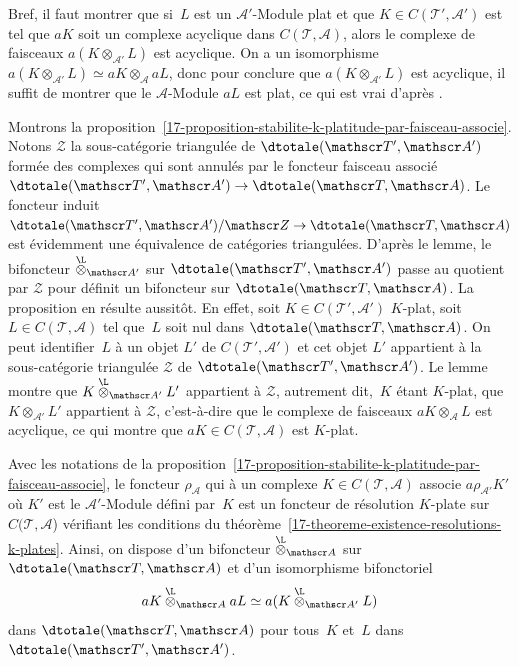 \documentclass[10pt]{../fichiers-configuration-latex/smfart}
\begin{document}
Bref, il faut montrer que si $L$ est un $\mathscr A'$-Module plat et que
$K\in C(\mathscr T',\mathscr A')$ est tel que $aK$ soit un complexe
acyclique dans $C(\mathscr T,\mathscr A)$, alors le complexe de faisceaux 
$a(K\otimes_{\mathscr A'} L)$ est acyclique. On a un isomorphisme
$a(K\otimes_{\mathscr A'} L)\simeq aK\otimes_{\mathscr A}aL$, donc pour
conclure que $a(K\otimes_{\mathscr A'} L)$ est acyclique, il suffit de
montrer que le $\mathscr A$-Module $aL$ est plat, ce qui est vrai d'après
.

\bigskip

Montrons la
proposition~\ref{17-proposition-stabilite-k-platitude-par-faisceau-associe}.
Notons $\mathscr Z$ la sous-catégorie triangulée de $\dtotale(\mathscr T',\mathscr
A')$ formée des complexes qui sont annulés par le foncteur faisceau associé
$\dtotale(\mathscr T',\mathscr A')\to \dtotale(\mathscr T,\mathscr A)$. Le foncteur
induit $\dtotale(\mathscr T',\mathscr A')/\mathscr Z\to \dtotale(\mathscr T,\mathscr A)$
est évidemment une équivalence de catégories triangulées. D'après le lemme,
le bifoncteur $\overset{\L}\otimes_{\mathscr A'}$ sur $\dtotale(\mathscr
T',\mathscr A')$ passe au quotient par $\mathscr Z$ pour définit un
bifoncteur sur $\dtotale(\mathscr T,\mathscr A)$. La proposition en résulte
aussitôt. En effet, soit $K\in C(\mathscr T',\mathscr A')$ $K$-plat, soit
$L\in C(\mathscr T,\mathscr A)$ tel que $L$ soit nul dans $\dtotale(\mathscr
T,\mathscr A)$. On peut identifier $L$ à un objet $L'$ de $C(\mathscr
T',\mathscr A')$ et cet objet $L'$ appartient à la sous-catégorie
triangulée $\mathscr Z$ de $\dtotale(\mathscr T',\mathscr A')$. Le lemme montre
que $K\overset{\L}\otimes_{\mathscr A'} L'$ appartient à $\mathscr
Z$, autrement dit, $K$ étant $K$-plat, que $K\otimes_{\mathscr A'} L'$
appartient à $\mathscr Z$, c'est-à-dire que le complexe 
de faisceaux $aK\otimes_{\mathscr A} L$ est acyclique, ce qui montre que
$aK\in C(\mathscr T,\mathscr A)$ est $K$-plat.

\begin{corollaire3}
Avec les notations de la
proposition~\ref{17-proposition-stabilite-k-platitude-par-faisceau-associe},
le foncteur $\rho_{\mathscr A}$ qui à un complexe $K\in C(\mathscr
T,\mathscr A)$ associe $a\rho_{\mathscr A'} K'$ où $K'$ est le $\mathscr
A'$-Module défini par $K$ est un foncteur de résolution $K$-plate sur
$C(\mathscr T,\mathscr A$) vérifiant les conditions du
théorème~\ref{17-theoreme-existence-resolutions-k-plates}.
Ainsi, on dispose d'un bifoncteur $\overset{\L}\otimes_{\mathscr  A}$
sur $\dtotale(\mathscr T,\mathscr A)$ et d'un isomorphisme bifonctoriel
\[aK\overset{\L}\otimes_{\mathscr A}aL\simeq
a(K\overset{\L}\otimes_{\mathscr A'}L)\]
dans $\dtotale(\mathscr T,\mathscr A)$ pour tous $K$ et $L$ dans $\dtotale(\mathscr
T',\mathscr A')$.
\end{corollaire3}
\end{document}
